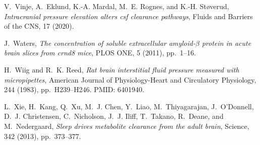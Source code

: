 \documentclass[10pt,letterpaper]{article}
\newcommand{\1}{^{(1)}}
\newcommand{\2}{^{(2)}}
\begin{document}
\begin{thebibliography}{10}
{\sc V.~Vinje, A.~Eklund, K.-A. Mardal, M.~E. {Rognes}, and K.-H. St{\o}verud},
  {\em Intracranial pressure elevation alters csf clearance pathways}, Fluids
  and Barriers of the CNS, 17 (2020).

{\sc J.~Waters}, {\em The concentration of soluble extracellular
  amyloid-$\beta$ protein in acute brain slices from crnd8 mice}, PLOS ONE, 5
  (2011), pp.~1--16.

{\sc H.~Wiig and R.~K. Reed}, {\em Rat brain interstitial fluid pressure
  measured with micropipettes}, American Journal of Physiology-Heart and
  Circulatory Physiology, 244 (1983), pp.~H239--H246.
\newblock PMID: 6401940.

{\sc L.~Xie, H.~Kang, Q.~Xu, M.~J. Chen, Y.~Liao, M.~Thiyagarajan,
  J.~O’Donnell, D.~J. Christensen, C.~Nicholson, J.~J. Iliff, T.~Takano,
  R.~Deane, and M.~Nedergaard}, {\em Sleep drives metabolite clearance from the
  adult brain}, Science, 342 (2013), pp.~373--377.

\end{thebibliography}
%
%
% 




\end{document}
